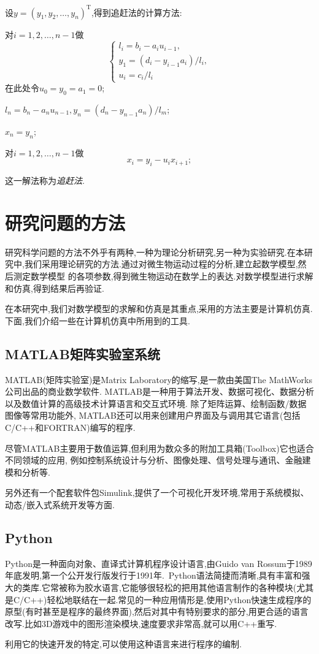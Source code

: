设$y=(y_1,y_2,\ldots,y_n)^{\mathrm{T}}$,得到追赶法的计算方法:
\begin{asparaenum}
\item 对$i=1,2,\ldots,n-1$做
\begin{equation*}
 \begin{cases}
 l_i=b_i-a_iu_{i-1},\\
 y_1=(d_i-y_{i-1}a_i)/l_i,\\
 u_i=c_i/l_i
 \end{cases}
\end{equation*}
在此处令$u_0=y_0=a_1=0$;
\item $l_n=b_n-a_n u_{n-1},y_n=(d_n-y_{n-1}a_n)/l_m$;
\item $x_n=y_n$;
\item 对$i=1,2,\ldots,n-1$做
\begin{equation*}
 x_i=y_i-u_i x_{i+1};
\end{equation*}
\end{asparaenum}\par
这一解法称为\emph{追赶法}.
\section{研究问题的方法}
研究科学问题的方法不外乎有两种,一种为理论分析研究,另一种为实验研究.在本研究中,我们采用理论研究的方法.通过对微生物运动过程的分析,建立起数学模型,然后测定数学模型
的各项参数,得到微生物运动在数学上的表达.对数学模型进行求解和仿真,得到结果后再验证.\par
在本研究中,我们对数学模型的求解和仿真是其重点,采用的方法主要是计算机仿真.下面,我们介绍一些在计算机仿真中所用到的工具.
\subsection{MATLAB矩阵实验室系统}
MATLAB(矩阵实验室)是Matrix Laboratory的缩写,是一款由美国The MathWorks公司出品的商业数学软件.
MATLAB是一种用于算法开发、数据可视化、数据分析以及数值计算的高级技术计算语言和交互式环境.
除了矩阵运算、绘制函数/数据图像等常用功能外,
MATLAB还可以用来创建用户界面及与调用其它语言(包括C/C++和FORTRAN)编写的程序.\par
尽管MATLAB主要用于数值运算,但利用为数众多的附加工具箱(Toolbox)它也适合不同领域的应用,
例如控制系统设计与分析、图像处理、信号处理与通讯、金融建模和分析等.\par
另外还有一个配套软件包Simulink,提供了一个可视化开发环境,常用于系统模拟、动态/嵌入式系统开发等方面.
\subsection{Python}
Python是一种面向对象、直译式计算机程序设计语言,由Guido van Rossum于1989年底发明,第一个公开发行版发行于1991年.~Python语法简捷而清晰,具有丰富和强大的类库.它常被称为胶水语言,它能够很轻松的把用其他语言制作的各种模块(尤其是C/C++)轻松地联结在一起.常见的一种应用情形是,使用Python快速生成程序的原型(有时甚至是程序的最终界面),然后对其中有特别要求的部分,用更合适的语言改写.比如3D游戏中的图形渲染模块,速度要求非常高,就可以用C++重写.\par
利用它的快速开发的特定,可以使用这种语言来进行程序的编制.
